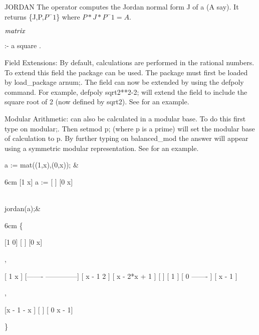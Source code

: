 \begin{Operator}[jordan]{JORDAN}
The operator  computes the Jordan normal form J
of a  (A say). It returns \{J,P,$P^-1$\} where $P*J*P^-1 = A$.

\begin{Syntax}
\(\meta{matrix}\)

 :- a square .
\end{Syntax}

Field Extensions:
By default, calculations are performed in the rational numbers. To 
extend this field the  package can be used. The package must
first be loaded by  load\_package arnum;. The field can now be extended
by using the defpoly command. For example, defpoly sqrt2**2-2; will
extend the field to include the square root of 2 (now defined by sqrt2).
See  for an example.

Modular Arithmetic:
 can also be calculated in a modular base. To do this 
first type on  modular;. Then setmod p; (where p is a prime) will set 
the modular base of calculation to p. By further typing on balanced\_mod
the answer will appear using a symmetric modular representation. See
 for an example.

\begin{Examples}

 a := mat((1,x),(0,x)); &
\begin{multilineoutput}{6cm}
     [1  x]
a := [    ]
     [0  x]
\end{multilineoutput}\\

 jordan(a);&
\begin{multilineoutput}{6cm}
\{

 [1  0]
 [    ]
 [0  x]

 ,


 [   1           x       ]
 [-------  --------------]
 [ x - 1     2           ]
 [          x  - 2*x + 1 ]
 [                       ]
 [               1       ]
 [   0        -------    ]
 [             x - 1     ]

 ,


 [x - 1   - x ]
 [            ]
 [  0    x - 1]

 \}
\end{multilineoutput}\\
\end{Examples}

\end{Operator}

